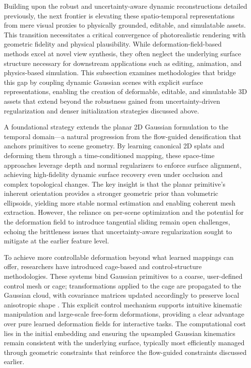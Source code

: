 \documentclass[11pt,a4paper]{article}
\begin{document}
Building upon the robust and uncertainty-aware dynamic reconstructions detailed previously, the next frontier is elevating these spatio-temporal representations from mere visual proxies to physically grounded, editable, and simulatable assets. This transition necessitates a critical convergence of photorealistic rendering with geometric fidelity and physical plausibility. While deformation-field-based methods \cite{arxiv:2409.12892v1,arxiv:2504.12905v3} excel at novel view synthesis, they often neglect the underlying surface structure necessary for downstream applications such as editing, animation, and physics-based simulation. This subsection examines methodologies that bridge this gap by coupling dynamic Gaussian scenes with explicit surface representations, enabling the creation of deformable, editable, and simulatable 3D assets that extend beyond the robustness gained from uncertainty-driven regularization and denser initialization strategies discussed above.

A foundational strategy extends the planar 2D Gaussian formulation to the temporal domain---a natural progression from the flow-guided densification that anchors primitives to scene geometry. By learning canonical 2D splats and deforming them through a time-conditioned mapping, these space-time approaches leverage depth and normal regularizers to enforce surface alignment, achieving high-fidelity dynamic surface recovery even under occlusion and complex topological changes. The key insight is that the planar primitive's inherent orientation provides a stronger geometric prior than volumetric ellipsoids, yielding more stable normal estimation and enabling coherent mesh extraction. However, the reliance on per-scene optimization and the potential for the deformation field to introduce tangential sliding remain open challenges, echoing the brittleness issues that uncertainty-aware regularization sought to mitigate at the earlier feature level.

To achieve more controllable deformation beyond what learned mappings can offer, researchers have introduced cage-based and control-structure methodologies. These systems bind Gaussian primitives to a coarse, user-defined control mesh or cage; transformations applied to the cage are propagated to the Gaussian cloud, with covariance matrices updated accordingly to preserve local anisotropic shape \cite{arxiv:2408.12894v1,arxiv:2403.17898v1}. This explicit control mechanism supports intuitive kinematic manipulation and large-scale free-form deformations, providing a clear advantage over pure learned deformation fields for interactive tasks. The computational cost lies in the initial embedding and ensuring the upsampled Gaussian kinematics remain consistent with the underlying surface, typically most efficiently managed through geometric constraints that reinforce the flow-guided constraints discussed earlier.
\end{document}
